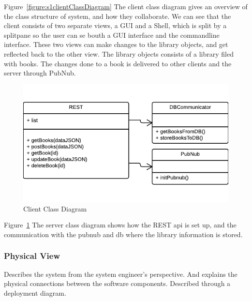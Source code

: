 Figure~\ref{figure:s1clientClassDiagram} The client class diagram gives an overview of the class structure of system, and how they collaborate. We can see that the client consists of two separate views, a GUI and a Shell, which is split by a splitpane so the user can se bouth a GUI interface and the commandline interface. These two views can make changes to the library objects, and get reflected back to the other view. The library objects consists of a library filed with books. The changes done to a book is delivered to other clients and the server through PubNub. 

\begin{figure}[h]
\centering
\includegraphics[width=5in]{image/architecture/s1/s1serverClassDiagram.png}
\caption{Client Class Diagram}
\label{figure:s1serverClassDiagram}
\end{figure}

Figure~\ref{figure:s1serverClassDiagram} The server class diagram shows how the REST api is set up, and the communication with the pubnub and db where the library information is stored.






\subsubsection{Physical View}
Describes the system from the system engineer's perspective. And explains the physical connections between the software components. Described through a deployment diagram. 

